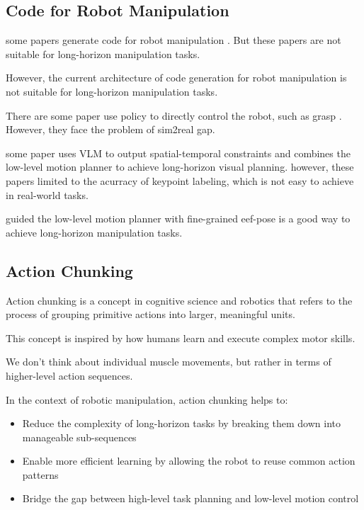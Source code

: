 \documentclass{article}
\begin{document}
\subsection{Code for Robot Manipulation}

some papers generate code for robot manipulation \cite{mu2024robocodex}. But these papers are not suitable for long-horizon manipulation tasks.

However, the current architecture of code generation for robot manipulation is not suitable for long-horizon manipulation tasks.

There are some paper use policy to directly control the robot, such as grasp \cite{wang2023dexgraspnet}. However, they face the problem of sim2real gap.


some paper uses VLM to output spatial-temporal constraints and combines the low-level motion planner to achieve long-horizon visual planning.
\cite{huang2024rekep,zhou2024codeasmonitor} however, these papers limited to the acurracy of keypoint labeling, which is not easy to achieve in real-world tasks.


guided the low-level motion planner with fine-grained eef-pose is a good way to achieve long-horizon manipulation tasks.

\subsection{Action Chunking}

Action chunking is a concept in cognitive science and robotics that refers to the process of grouping primitive actions into larger, meaningful units.

This concept is inspired by how humans learn and execute complex motor skills.

We don't think about individual muscle movements, but rather in terms of higher-level action sequences.

In the context of robotic manipulation, action chunking helps to:

\begin{itemize}
    \item Reduce the complexity of long-horizon tasks by breaking them down into manageable sub-sequences
    \item Enable more efficient learning by allowing the robot to reuse common action patterns
    \item Bridge the gap between high-level task planning and low-level motion control
\end{itemize}
\end{document}
